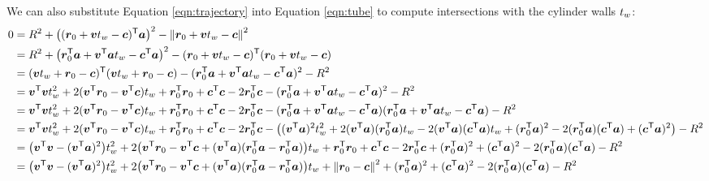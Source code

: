 \documentclass[10pt,letterpaper]{article}
\begin{document}
We can also substitute Equation \ref{eqn:trajectory} into Equation \ref{eqn:tube} to compute intersections with the cylinder walls $\walltime$:
	\begin{equation}
		\begin{aligned}
			0 &= \radius^2 + \big((\source + \path \walltime - \cent)^\trans\axis \big)^2 - \norm{\source + \path\walltime - \cent}^2 \\
			&= \radius^2 + \big(\source^\trans\axis + \path^\trans\axis \walltime - \cent^\trans\axis \big)^2 - (\source + \path\walltime - \cent)^\trans(\source + \path\walltime - \cent) \\
			&= (\path\walltime + \source - \cent)^\trans(\path\walltime + \source - \cent) - (\source^\trans\axis + \path^\trans\axis\walltime - \cent^\trans\axis)^2 - \radius^2 \\
			&= \path^\trans\path\walltime^2 + 2(\path^\trans\source - \path^\trans\cent)\walltime + \source^\trans\source + \cent^\trans\cent - 2\source^\trans\cent - (\source^\trans\axis + \path^\trans\axis\walltime - \cent^\trans\axis)^2 - \radius^2 \\
			&= \path^\trans\path\walltime^2 + 2(\path^\trans\source - \path^\trans\cent)\walltime + \source^\trans\source + \cent^\trans\cent - 2\source^\trans\cent - (\source^\trans\axis + \path^\trans\axis\walltime - \cent^\trans\axis)(\source^\trans\axis + \path^\trans\axis\walltime - \cent^\trans\axis) - \radius^2 \\
			&= \path^\trans\path\walltime^2 + 2(\path^\trans\source - \path^\trans\cent)\walltime + \source^\trans\source + \cent^\trans\cent - 2\source^\trans\cent - \big((\path^\trans\axis)^2\walltime^2 + 2(\path^\trans\axis)(\source^\trans\axis)\walltime - 2(\path^\trans\axis)(\cent^\trans\axis)\walltime + (\source^\trans\axis)^2 - 2(\source^\trans\axis)(\cent^\trans\axis) + (\cent^\trans\axis)^2\big) - \radius^2 \\
			&= \big(\path^\trans\path - (\path^\trans\axis)^2\big)\walltime^2 + 2\big(\path^\trans\source - \path^\trans\cent + (\path^\trans\axis)(\source^\trans\axis - \source^\trans\axis)\big)\walltime + \source^\trans\source + \cent^\trans\cent - 2\source^\trans\cent + (\source^\trans\axis)^2 + (\cent^\trans\axis)^2 - 2(\source^\trans\axis)(\cent^\trans\axis) - \radius^2 \\
			&= \big(\path^\trans\path - (\path^\trans\axis)^2\big)\walltime^2 + 2\big(\path^\trans\source - \path^\trans\cent + (\path^\trans\axis)(\source^\trans\axis - \source^\trans\axis)\big)\walltime + \norm{\source - \cent}^2 + (\source^\trans\axis)^2 + (\cent^\trans\axis)^2 - 2(\source^\trans\axis)(\cent^\trans\axis) - \radius^2
		\end{aligned}
	\end{equation}
\end{document}
